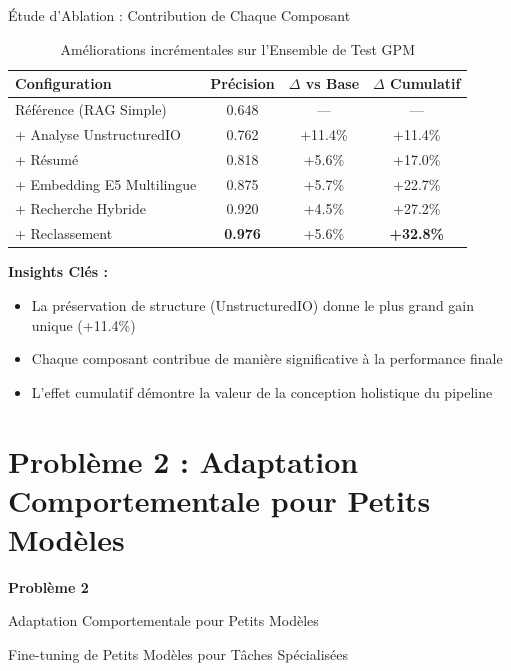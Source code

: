 \documentclass[11pt, aspectratio=169, xcolor=table]{beamer}
\begin{document}
\begin{frame}{Étude d'Ablation : Contribution de Chaque Composant}
    \begin{table}[H]
        \centering
        \caption{Améliorations incrémentales sur l'Ensemble de Test GPM}
        \small
        \begin{tabular}{|l|c|c|c|}
            \hline
            \textbf{Configuration} & \textbf{Précision} & \textbf{$\Delta$ vs Base} & \textbf{$\Delta$ Cumulatif} \\
            \hline
            Référence (RAG Simple) & 0.648 & --- & --- \\
            \hline
            + Analyse UnstructuredIO & 0.762 & +11.4\% & +11.4\% \\
            \hline
            + Résumé & 0.818 & +5.6\% & +17.0\% \\
            \hline
            + Embedding E5 Multilingue & 0.875 & +5.7\% & +22.7\% \\
            \hline
            + Recherche Hybride & 0.920 & +4.5\% & +27.2\% \\
            \hline
            + Reclassement & \textbf{0.976} & +5.6\% & \textbf{+32.8\%} \\
            \hline
        \end{tabular}
    \end{table}

    \textbf{Insights Clés :}
    \begin{itemize}
        \item La préservation de structure (UnstructuredIO) donne le plus grand gain unique (+11.4\%)
        \item Chaque composant contribue de manière significative à la performance finale
        \item L'effet cumulatif démontre la valeur de la conception holistique du pipeline
    \end{itemize}
\end{frame}

\section{Problème 2 : Adaptation Comportementale pour Petits Modèles}

\begin{frame}[plain]
    \begin{center}
        \vfill
        {\Huge\color{MainNavy}\textbf{Problème 2}}
        \vspace{0.5cm}
        
        {\Large Adaptation Comportementale pour Petits Modèles}
        \vspace{0.3cm}
        
        {\large Fine-tuning de Petits Modèles pour Tâches Spécialisées}
        \vfill
    \end{center}
\end{frame}
\end{document}
